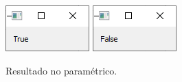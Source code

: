 \begin{figure}
\centering
  \includegraphics[width=0.3\linewidth]{images/stl_noparam_true} \hfill
  \includegraphics[width=0.3\linewidth]{images/stl_noparam_false} 
\caption{Resultado no paramétrico.}
\label{fig:noparam}
\end{figure}
